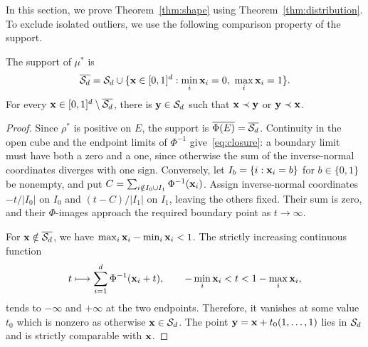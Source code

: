 \documentclass[11pt,letterpaper]{article}
\begin{document}
In this section, we prove Theorem~\ref{thm:shape} using Theorem~\ref{thm:distribution}. To exclude isolated outliers, we use the following comparison property of the support.
\begin{lemma}\label{lem:support}
      The support of $\mu^\ast$ is
      \begin{equation}\label{eq:closure}
            \overline{\cS_d} =\cS_d\cup\{\vx\in[0,1]^d:\min_i\vx_i=0,\ \max_i\vx_i=1\}.
      \end{equation}
      For every $\mathbf x\in[0,1]^d\setminus\overline{\mathcal S_d}$, there is $\mathbf y\in\mathcal S_d$ such that $\mathbf x\prec\mathbf y$ or $\mathbf y\prec\mathbf x$.
\end{lemma}
\begin{proof}
      Since $\rho^\ast$ is positive on $E$, the support is $\overline{\Phi(E)}=\overline{\mathcal S_d}$. Continuity in the open cube and the endpoint limits of $\Phi^{-1}$ give~\eqref{eq:closure}: a boundary limit must have both a zero and a one, since otherwise the sum of the inverse-normal coordinates diverges with one sign. Conversely, let $I_b=\{i:\mathbf x_i=b\}$ for $b\in\{0,1\}$ be nonempty, and put $C=\sum_{i\notin I_0\cup I_1}\Phi^{-1}(\mathbf x_i)$. Assign inverse-normal coordinates $-t/|I_0|$ on $I_0$ and $(t-C)/|I_1|$ on $I_1$, leaving the others fixed. Their sum is zero, and their $\Phi$-images approach the required boundary point as $t\to\infty$.

      For $\mathbf x\notin\overline{\mathcal S_d}$, we have $\max_i\mathbf x_i-\min_i\mathbf x_i<1$. The strictly increasing continuous function
      \[
            t\longmapsto\sum_{i=1}^d\Phi^{-1}(\mathbf x_i+t), \qquad -\min_i\mathbf x_i<t<1-\max_i\mathbf x_i,
      \]
      tends to $-\infty$ and $+\infty$ at the two endpoints. Therefore, it vanishes at some value $t_0$ which is nonzero as otherwise $\mathbf x\in\mathcal S_d$. The point $\mathbf y=\mathbf x+t_0(1,\ldots,1)$ lies in $\mathcal S_d$ and is strictly comparable with $\mathbf x$.
\end{proof}
\end{document}
